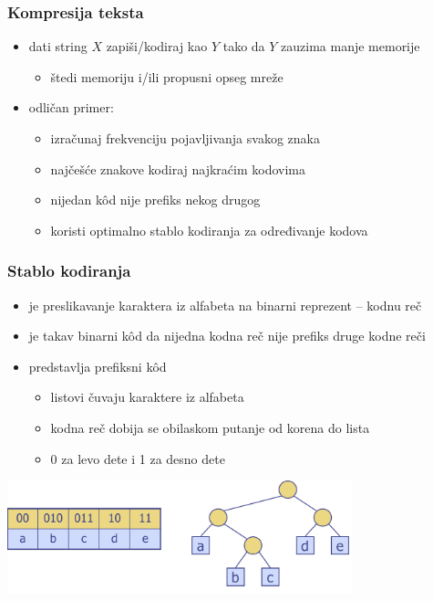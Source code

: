\documentclass[compress]{beamer}
\begin{document}
\begin{frame}[fragile]
  \frametitle{Kompresija teksta}
  \begin{itemize}
    \item dati string $X$ zapiši/kodiraj kao $Y$ tako da $Y$ zauzima 
    manje memorije 
    \begin{itemize}
      \item štedi memoriju i/ili propusni opseg mreže
    \end{itemize}
    \item odličan primer:  
    \begin{itemize}
      \item izračunaj frekvenciju pojavljivanja svakog znaka
      \item najčešće znakove kodiraj najkraćim kodovima
      \item nijedan kôd nije prefiks nekog drugog
      \item koristi optimalno stablo kodiranja za određivanje kodova
    \end{itemize}
  \end{itemize}
\end{frame}

\begin{frame}[fragile]
  \frametitle{Stablo kodiranja}
  \begin{itemize}
    \item {} je preslikavanje karaktera iz alfabeta na binarni 
    reprezent -- kodnu reč
    \item {} je takav binarni kôd da nijedna kodna 
    reč nije prefiks druge kodne reči
    \item {} predstavlja prefiksni kôd
    \begin{itemize}
      \item listovi čuvaju karaktere iz alfabeta
      \item kodna reč dobija se obilaskom putanje od korena do lista
      \item 0 za levo dete i 1 za desno dete
    \end{itemize}
  \end{itemize}
  \begin{center}
    \includegraphics[width=10cm]{asp-13-pic12.png}
  \end{center}
\end{frame}
\end{document}
